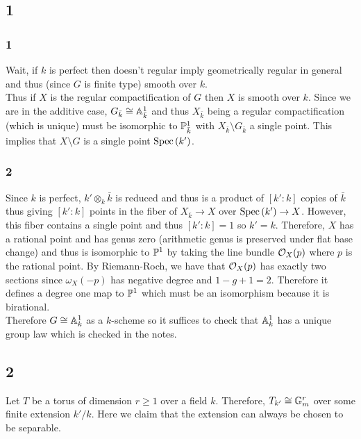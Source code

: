 \documentclass[12pt]{article}
\begin{document}
\subsection{1}

\subsubsection{1}

Wait, if $k$ is perfect then doesn't regular imply geometrically regular in general and thus (since $G$ is finite type) smooth over $k$.
\bigskip\\
Thus if $X$ is the regular compactification of $G$ then $X$ is smooth over $k$. Since we are in the additive case, $G_{\bar{k}} \cong \A^1_{\bar{k}}$ and thus $X_{\bar{k}}$ being a regular compactification (which is unique) must be isomorphic to $\P^1_{\bar{k}}$ with $X_{\bar{k}} \setminus G_{\bar{k}}$ a single point. This implies that $X \setminus G$ is a single point $\Spec{k'}$.

\subsubsection{2}

Since $k$ is perfect, $k' \otimes_k \bar{k}$ is reduced and thus is a product of $[k' : k]$ copies of $\bar{k}$ thus giving $[k' : k]$ points in the fiber of $X_{\bar{k}} \to X$ over $\Spec{k'} \to X$. However, this fiber contains a single point and thus $[k' : k] = 1$ so $k' = k$. Therefore, $X$ has a rational point and has genus zero (arithmetic genus is preserved under flat base change) and thus is isomorphic to $\P^1$ by taking the line bundle $\struct{X}(p)$ where $p$ is the rational point. By Riemann-Roch, we have that $\struct{X}(p)$ has exactly two sections since $\omega_X(-p)$ has negative degree and $1 - g + 1 = 2$. Therefore it defines a degree one map to $\P^1$ which must be an isomorphism because it is birational. 
\bigskip\\
Therefore $G \cong \A^1_k$ as a $k$-scheme so it suffices to check that $\A^1_k$ has a unique group law which is checked in the notes.

\subsection{2}

Let $T$ be a torus of dimension $r \ge 1$ over a field $k$. Therefore, $T_{k'} \cong \Gm^r$ over some finite extension $k'/k$. Here we claim that the extension can always be chosen to be separable.
\end{document}
